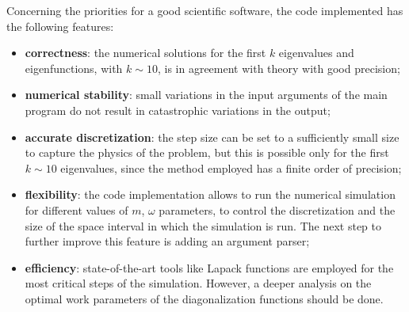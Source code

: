 \documentclass[pra, onecolumn, notitlepage, floats, 11pt]{revtex4-1}
\begin{document}
Concerning the priorities for a good scientific software, the code implemented has the following features:
\begin{itemize}
    \item \textbf{correctness}: the numerical solutions for the first \( k \) eigenvalues and eigenfunctions, with \( k \sim 10 \), is in agreement with theory with good precision;
    \item \textbf{numerical stability}: small variations in the input arguments of the main program do not result in catastrophic variations in the output;
    \item \textbf{accurate discretization}: the step size can be set to a sufficiently small size to capture the physics of the problem, but this is possible only for the first \( k \sim 10 \) eigenvalues, since the method employed has a finite order of precision;
    \item \textbf{flexibility}: the code implementation allows to run the numerical simulation for different values of \( m \), \( \omega \) parameters, to control the discretization and the size of the space interval in which the simulation is run. The next step to further improve this feature is adding an argument parser;
    \item \textbf{efficiency}: state-of-the-art tools like Lapack functions are employed for the most critical steps of the simulation. However, a deeper analysis on the optimal work parameters of the diagonalization functions should be done.
\end{itemize}
\end{document}
